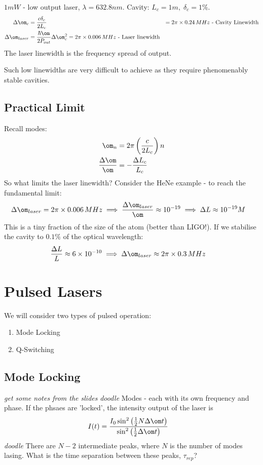 \documentclass[a4paper, 11pt, normalem]{report}
\begin{document}
\begin{example}
$1mW$ - low output laser, $\lambda=632.8nm$.
Cavity: $L_c=1m,\;\delta_c=1\%$.
\begin{align}
    \Delta\om_c &= \frac{c\delta_c}{2L_c} &= 2\pi\times0.24\,MHz \text{ - Cavity Linewidth} \\
    \Delta\om_{laser} &= \frac{\hbar\om}{2P_{out}}\Delta\om_c^2 = 2\pi\times0.006\,MHz \text{ - Laser linewidth}
\end{align}
The laser linewidth is the frequency spread of output. 
\end{example}
Such low linewidths are very difficult to achieve as they require phenomenably stable cavities. 

\section{Practical Limit}
Recall modes:
\begin{align}
    \om_n &= 2\pi\left(\frac{c}{2L_c}\right)n \\
    \frac{\Delta\om}{\om} &= -\frac{\Delta L_c}{L_c}
\end{align}
So what limits the laser linewidth?
Consider the HeNe example - to reach the fundamental limit:
\begin{align}
    \Delta\om_{laser} &= 2\pi\times0.006\,MHz \implies \frac{\Delta\om_{laser}}{\om} \approx 10^{-19} \implies \Delta L \approx 10^{-19}M
\end{align}
This is a tiny fraction of the size of the atom (better than LIGO!).
If we stabilise the cavity to $0.1\%$ of the optical wavelength:
\begin{align}
    \frac{\Delta L}{L} &\approx 6\times10^{-10} \implies \Delta\om_{laser} \approx 2\pi\times0.3\,MHz
\end{align}



\chapter{Pulsed Lasers}
We will consider two types of pulsed operation:
\begin{enumerate}
    \item Mode Locking
    \item Q-Switching
\end{enumerate}

\section{Mode Locking}
\textit{get some notes from the slides}
\textit{doodle}
Modes - each with its own frequency and phase. 
If the phsaes are 'locked', the intensity output of the laser is
\begin{align}
    I(t) &= \frac{I_0\sin^2\left(\frac12N\Delta\om t\right)}{\sin^2\left(\frac12\Delta\om t\right)}
\end{align}
\textit{doodle}
There are $N-2$ intermediate peaks, where $N$ is the number of modes lasing. 
What is the time separation between these peaks, $\tau_{rep}$?
\end{document}
